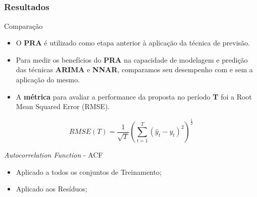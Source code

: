 \documentclass[aspectratio=169]{beamer}
\begin{document}
\subsection{}
\begin{frame}
\frametitle{Resultados}

\begin{block}{Comparação}
\begin{itemize} \footnotesize%
    \item O \textbf{PRA} é utilizado como etapa anterior à aplicação da técnica de previsão.
    \item Para medir os benefícios do \textbf{PRA} na capacidade de modelagem e predição das técnicas \textbf{ARIMA} e \textbf{NNAR}, comparamos seu desempenho com e sem a aplicação do mesmo.
    \item A \textbf{métrica} para avaliar a performance da proposta no período \textbf{T} foi a Root Mean Squared Error (RMSE).
\end{itemize}
\end{block}

\begin{equation}
RMSE(T) = \frac{1}{\sqrt{T}} (\sum_{t=1}^{T} (\hat{y}_t - y_t)^2)^\frac{1}{2}    
\end{equation}
\begin{block}{\textit{Autocorrelation Function} - ACF}

\begin{itemize} \small%
    \item Aplicado a todos os conjuntos de Treinamento;
    \item Aplicado aos Resíduos;
\end{itemize}
\end{block}
 
\end{frame}

\end{document}
